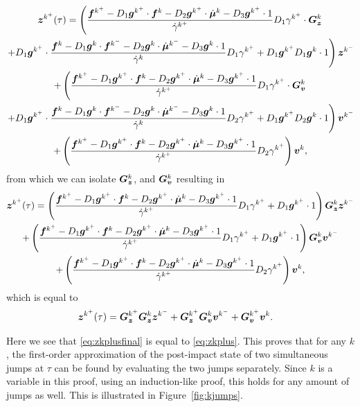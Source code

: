 \documentclass[DC2017114Bouma.tex]{subfiles}
\begin{document}
\begin{multline}
\zb^{k^+}(\tau) = \left(\frac{\fb^{k^+} - D_1\gb^{k^+}\cdot\fb^{k} - D_2\gb^{k^+}\cdot\dot{\mub}^{k} - D_3\gb^{k^+}\cdot 1}{\dot{\gamma}^{k^+}}D_1\gamma^{k^+}\cdot\Gb_\zb^{k}\right.\\
\left. + D_1\gb^{k^+}\cdot\frac{\fb^{k} - D_1\gb^{k}\cdot\fb^{k^-} - D_2\gb^{k}\cdot\dot{\mub}^{k^-} - D_3\gb^{k}\cdot 1}{\dot{\gamma}^{k}}D_1\gamma^{k^+} + D_1\gb^{k^+} D_1\gb^{k}\cdot 1\right)\zb^{k^-}\\
+ \left(\frac{\fb^{k^+}-D_1\gb^{k^+}\cdot\fb^{k} -D_2\gb^{k^+}\cdot\dot{\mub}^{k} - D_3\gb^{k^+}\cdot 1}{\dot{\gamma}^{k^+}}D_1\gamma^{k^+}\cdot\Gb_\vb^{k}\right.\\
\left. + D_1\gb^{k^+}\cdot\frac{\fb^{k}-D_1\gb^{k}\cdot\fb^{k^-}-D_2\gb^{k}\cdot\dot{\mub}^{k^-}-D_3\gb^{k}\cdot 1}{\dot{\gamma}^{k}}D_2\gamma^{k^+} + D_1\gb^{k^+} D_2\gb^{k}\cdot 1 \right)\vb^{k^-}\\
+ \left(\frac{\fb^{k^+}-D_1\gb^{k^+}\cdot\fb^{k} - D_2\gb^{k^+}\cdot\dot{\mub}^{k} - D_3\gb^{k^+}\cdot 1}{\dot{\gamma}^{k^+}}D_2\gamma^{k^+}\right)\vb^{k},
\end{multline}
from which we can isolate $\Gb_\zb^{k}$, and $\Gb_\vb^{k}$ resulting in
\begin{multline}
\zb^{k^+}(\tau) = \left(\frac{\fb^{k^+} - D_1\gb^{k^+}\cdot\fb^{k}  - D_2\gb^{k^+}\cdot\dot{\mub}^{k} - D_3\gb^{k^+}\cdot 1}{\dot{\gamma}^{k^+}}D_1\gamma^{k^+} + D_1\gb^{k^+}\cdot 1\right)\Gb_\zb^{k}\zb^{k^-}\\
+ \left(\frac{\fb^{k^+} - D_1\gb^{k^+}\cdot\fb^{k} - D_2\gb^{k^+}\cdot\dot{\mub}^{k} - D_3\gb^{k^+}\cdot 1}{\dot{\gamma}^{k^+}}D_1\gamma^{k^+} + D_1\gb^{k^+}\cdot 1\right)\Gb_\vb^{k}\vb^{k^-} \\
+ \left(\frac{\fb^{k^+}-D_1\gb^{k^+}\cdot\fb^{k} - D_2\gb^{k^+}\cdot\dot{\mub}^{k} - D_3\gb^{k^+}\cdot 1}{\dot{\gamma}^{k^+}}D_2\gamma^{k^+}\right)\vb^{k},
\end{multline}
which is equal to
\begin{align}
&\zb^{k^+}(\tau) = \Gb_\zb^{k^+}\Gb_\zb^k\zb^{k^-} + \Gb_\zb^{k^+}\Gb_\vb^k\vb^{k^-} + \Gb_\vb^{k^+}\vb^{k}.\label{eq:zkplusfinal}
\end{align}

Here we see that \eqref{eq:zkplusfinal} is equal to \eqref{eq:zkplus}. This proves that for any $k$, the first-order approximation of the post-impact state of two simultaneous jumps at $\tau$ can be found by evaluating the two jumps separately. Since $k$ is a variable in this proof, using an induction-like proof, this holds for any amount of jumps as well. This is illustrated in Figure~\ref{fig:kjumps}. 
\end{document}
